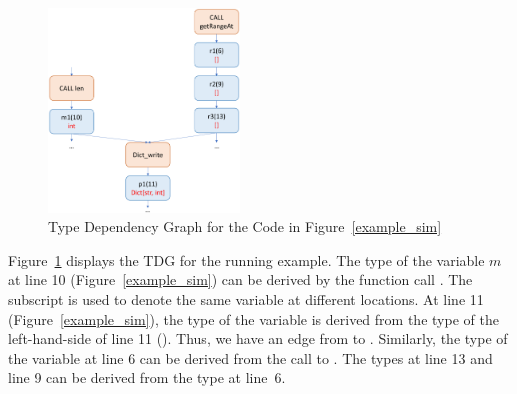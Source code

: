 
\begin{figure}[t]
	\begin{center}
	  \includegraphics[width=2in]{figures/type-dep-graph-2}
          \vspace{-8pt}
		\caption{Type Dependency Graph for the Code in Figure~\ref{example_sim}}
		\label{tdg}
	\end{center}
\end{figure}


Figure~\ref{tdg} displays the TDG for the running example. The
type of the variable $m$ at line 10 (Figure~\ref{example_sim}) can be
derived by the function call . The subscript is used to 
denote the same variable at different locations. At line 11
(Figure~\ref{example_sim}), the type of the variable  is
derived from the type of the left-hand-side of line 11
(). Thus, we have an edge from  to
. Similarly, the type of the variable  at line 6 can
be derived from the call to . The types at line 13
and line 9 can be derived from the type at line~6.
